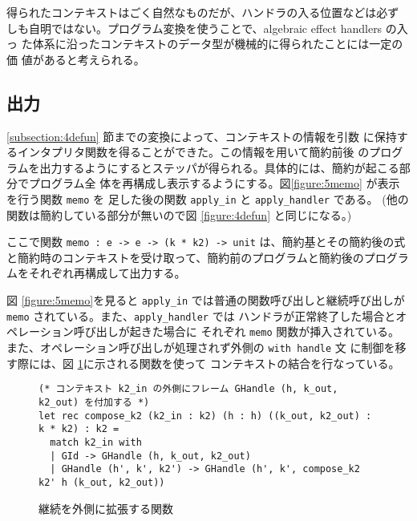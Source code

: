 得られたコンテキストはごく自然なものだが、ハンドラの入る位置などは必ず
しも自明ではない。プログラム変換を使うことで、algebraic effect handlers の入っ
た体系に沿ったコンテキストのデータ型が機械的に得られたことには一定の価
値があると考えられる。

\subsection{出力}
\label{subsection:memo}

\ref{subsection:4defun} 節までの変換によって、コンテキストの情報を引数
に保持するインタプリタ関数を得ることができた。この情報を用いて簡約前後
のプログラムを出力するようにするとステッパが得られる。具体的には、簡約が起こる部分でプログラム全
体を再構成し表示するようにする。図\ref{figure:5memo}
が表示を行う関数 \texttt{memo} を
足した後の関数 \texttt{apply\_in} と \texttt{apply\_handler}
である。
(他の関数は簡約している部分が無いので図 \ref{figure:4defun} と同じになる。)

ここで関数 \texttt{memo :\ e -> e -> (k * k2) -> unit} は、簡約基とその簡約後の式と簡約時のコンテキストを受け取って、簡約前のプログラムと簡約後のプログラムをそれぞれ再構成して出力する。

図 \ref{figure:5memo}を見ると \texttt{apply\_in} では普通の関数呼び出しと継続呼び出しが
\texttt{memo} されている。また、\texttt{apply\_handler} では
ハンドラが正常終了した場合とオペレーション呼び出しが起きた場合に
それぞれ \texttt{memo} 関数が挿入されている。
また、オペレーション呼び出しが処理されず外側の \texttt{with handle} 文
に制御を移す際には、図 \ref{figure:compose}に示される関数を使って
コンテキストの結合を行なっている。

\begin{figure}[t]
\begin{verbatim}
(* コンテキスト k2_in の外側にフレーム GHandle (h, k_out, k2_out) を付加する *)
let rec compose_k2 (k2_in : k2) (h : h) ((k_out, k2_out) : k * k2) : k2 =
  match k2_in with
  | GId -> GHandle (h, k_out, k2_out)
  | GHandle (h', k', k2') -> GHandle (h', k', compose_k2 k2' h (k_out, k2_out))
\end{verbatim}
\caption{継続を外側に拡張する関数}
\label{figure:compose}
\end{figure}

